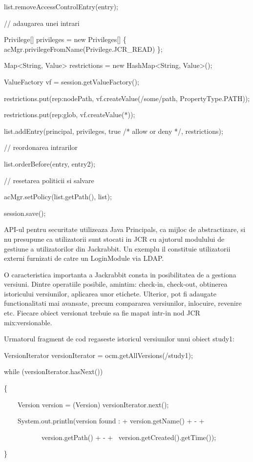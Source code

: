 \bigskip

list.removeAccessControlEntry(entry);


\bigskip

// adaugarea unei intrari

Privilege[] privileges = new Privileges[] \{ acMgr.privilegeFromName(Privilege.JCR\_READ) \};

Map{\textless}String, Value{\textgreater} restrictions = new HashMap{\textless}String, Value{\textgreater}();

ValueFactory vf = session.getValueFactory();

restrictions.put({\textquotedbl}rep:nodePath{\textquotedbl}, vf.createValue({\textquotedbl}/some/path{\textquotedbl}, PropertyType.PATH));

restrictions.put({\textquotedbl}rep:glob{\textquotedbl}, vf.createValue({\textquotedbl}*{\textquotedbl}));

list.addEntry(principal, privileges, true /* allow or deny */, restrictions);


\bigskip

// reordonarea intrarilor

list.orderBefore(entry, entry2);


\bigskip

// resetarea politicii si salvare

acMgr.setPolicy(list.getPath(), list);

session.save();


\bigskip

API-ul pentru securitate utilizeaza Java Principals, ca mijloc de abstractizare, si nu presupune ca utilizatorii sunt stocati in JCR cu ajutorul modulului de gestiune a utilizatorilor din Jackrabbit. Un exemplu il constituie utilizatorii externi furnizati de catre un LoginModule via LDAP.


\bigskip

O caracteristica importanta a Jackrabbit consta in posibilitatea de a gestiona versiuni. Dintre operatiile posibile, amintim: check-in, check-out, obtinerea istoricului versiunilor, aplicarea unor etichete. Ulterior, pot fi adaugate functionalitati mai avansate, precum compararea versiunilor, inlocuire, revenire etc. Fiecare obiect versionat trebuie sa fie mapat intr-in nod JCR mix:versionable. \ 


\bigskip

Urmatorul fragment de cod regaseste istoricul versiunilor unui obiect study1:


\bigskip

VersionIterator versionIterator = ocm.getAllVersions({\textquotedbl}/study1{\textquotedbl});

while (versionIterator.hasNext())

\{

\ \ \ \ Version version = (Version) versionIterator.next();

\ \ \ \ System.out.println({\textquotedbl}version found : {\textquotedbl}+ version.getName() + {\textquotedbl} - {\textquotedbl} +

\ \ \ \ \ \ \ \ \ \ \ version.getPath() + {\textquotedbl} - {\textquotedbl} + \ version.getCreated().getTime());

\}

